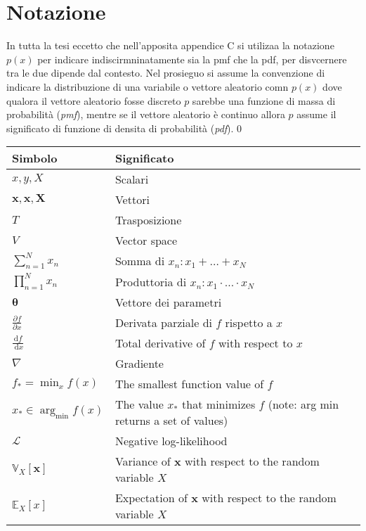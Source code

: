 \chapter{Notazione}

In tutta la tesi eccetto che nell'apposita appendice C si utilizaa la notazione $p(x)$ per indicare indiscirmninatamente sia 
la pmf che la pdf, per disvcernere tra le due dipende dal contesto.
Nel prosieguo si assume la convenzione di indicare la distribuzione di una variabile o vettore aleatorio comn $p(x)$ dove 
qualora il vettore aleatorio fosse discreto  $p$ sarebbe una funzione di massa di probabilità  (\emph{pmf}), mentre se il vettore aleatorio è continuo
allora $p$ assume il significato di funzione di densita di probabilità (\emph{pdf}).
0


\begin{table}
    \centering
    \footnotesize
\begin{tabular}{ll}
    \toprule 
    Simbolo & Significato \\
    \midrule 
    $x,y,X$ & Scalari \\
    $\boldsymbol{x},\mathbf{x},\mathbf{X}$ & Vettori \\
    $T$ & Trasposizione \\
    $V$ & Vector space \\
    $\sum_{n=1}^N x_n$ & Somma di $x_n: x_1+\ldots+x_N$ \\
    $\prod_{n=1}^N x_n$ & Produttoria di $x_n: x_1 \cdot \ldots \cdot x_N$ \\
    $\boldsymbol{\theta}$ & Vettore dei parametri \\
    $\frac{\partial f}{\partial x}$ & Derivata parziale di $f$ rispetto a $x$ \\
    $\frac{\mathrm{d} f}{\mathrm{~d} x}$ & Total derivative of $f$ with respect to $x$ \\
    $\nabla$ & Gradiente \\
    $f_*=\min _x f(x)$ & The smallest function value of $f$ \\
    $x_* \in \arg _{\min } f(x)$ & The value $x_*$ that minimizes $f$ (note: arg min returns a set of values) \\
    $\mathcal{L}$ & Negative log-likelihood \\
    $\mathbb{V}_X[\boldsymbol{x}]$ & Variance of $\boldsymbol{x}$ with respect to the random variable $X$ \\
    $\mathbb{E}_X[x]$ & Expectation of $\boldsymbol{x}$ with respect to the random variable $X$ \\

\end{tabular}
\end{table}
